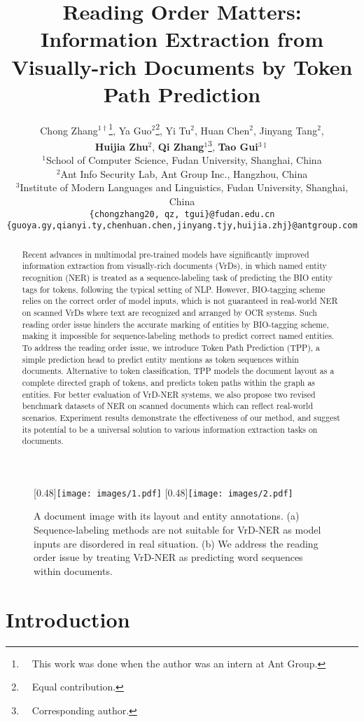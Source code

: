 \documentclass[11pt]{article}
\title{Reading Order Matters: Information Extraction from Visually-rich Documents by Token Path Prediction}
\author{
    Chong Zhang$^{1\dagger}$\thanks{\ \ This work was done when the author was an intern at Ant Group.}, Ya Guo$^{2}$\thanks{\ \ Equal contribution.}, Yi Tu$^2$, Huan Chen$^2$, Jinyang Tang$^2$, \\
    \textbf{Huijia Zhu}$^2$, \textbf{Qi Zhang}$^1$\thanks{\ \ Corresponding author.}, \textbf{Tao Gui}$^{3\ddagger}$ \\
     $^1$School of Computer Science, Fudan University, Shanghai, China \\ $^2$Ant Info Security Lab, Ant Group Inc., Hangzhou, China \\
     $^3$Institute of Modern Languages and Linguistics, Fudan University, Shanghai, China \\
     \texttt{\{chongzhang20, qz, tgui\}@fudan.edu.cn} \\ 
     \texttt{\{guoya.gy,qianyi.ty,chenhuan.chen,jinyang.tjy,huijia.zhj\}@antgroup.com} \\
     }
\begin{document}
\maketitle
\begin{abstract}
Recent advances in multimodal pre-trained models have significantly improved information extraction from visually-rich documents (VrDs), in which named entity recognition (NER) is treated as a sequence-labeling task of predicting the BIO entity tags for tokens, following the typical setting of NLP. 
However, BIO-tagging scheme relies on the correct order of model inputs, which is not guaranteed in real-world NER on scanned VrDs where text are recognized and arranged by OCR systems. 
Such reading order issue hinders the accurate marking of entities by BIO-tagging scheme, making it impossible for sequence-labeling methods to predict correct named entities.
To address the reading order issue, we introduce Token Path Prediction (TPP), a simple prediction head to predict entity mentions as token sequences within documents. 
Alternative to token classification, TPP models the document layout as a complete directed graph of tokens, and predicts token paths within the graph as entities. 
For better evaluation of VrD-NER systems, we also propose two revised benchmark datasets of NER on scanned documents which can reflect real-world scenarios.
Experiment results demonstrate the effectiveness of our method, and suggest its potential to be a universal solution to various information extraction tasks on documents.
\end{abstract}

\begin{figure}[t]
\centering
    [0.48\textwidth]{\texttt{[image: images/1.pdf]}}
    [0.48\textwidth]{\texttt{[image: images/2.pdf]}}  
    \caption{
        A document image with its layout and entity annotations. 
        (a) Sequence-labeling methods are not suitable for VrD-NER as model inputs are disordered in real situation. 
        (b) We address the reading order issue by treating VrD-NER as predicting word sequences within documents.}
    \label{fig:1}
\end{figure}

\section{Introduction}
\end{document}
